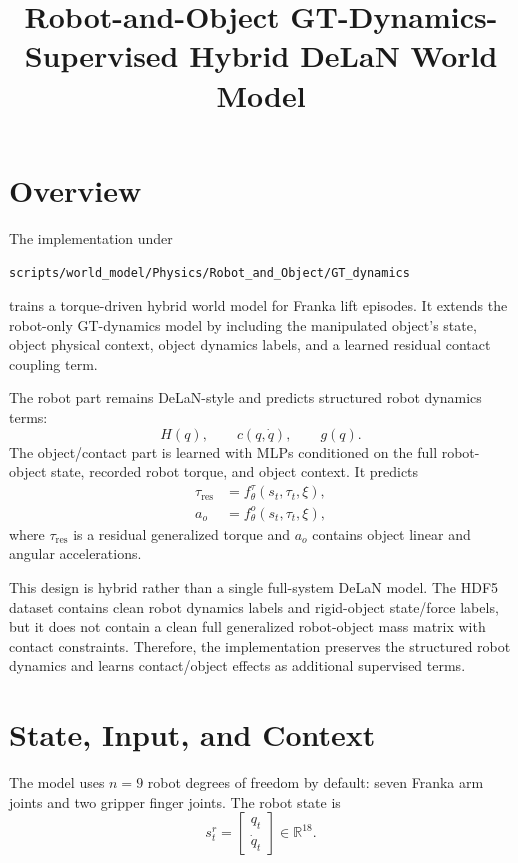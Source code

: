 \documentclass[11pt]{article}
\title{Robot-and-Object GT-Dynamics-Supervised Hybrid DeLaN World Model}
\author{}
\date{}
\begin{document}
\maketitle

\section{Overview}

The implementation under
\begin{center}
\texttt{scripts/world\_model/Physics/Robot\_and\_Object/GT\_dynamics}
\end{center}
trains a torque-driven hybrid world model for Franka lift episodes. It extends
the robot-only GT-dynamics model by including the manipulated object's state,
object physical context, object dynamics labels, and a learned residual contact
coupling term.

The robot part remains DeLaN-style and predicts structured robot dynamics terms:
\begin{equation}
  H(q), \qquad c(q,\dot{q}), \qquad g(q).
\end{equation}
The object/contact part is learned with MLPs conditioned on the full robot-object
state, recorded robot torque, and object context. It predicts
\begin{align}
  \tau_{\mathrm{res}} &= f_{\theta}^{\tau}(s_t,\tau_t,\xi), \\
  a_o &= f_{\theta}^{o}(s_t,\tau_t,\xi),
\end{align}
where \(\tau_{\mathrm{res}}\) is a residual generalized torque and \(a_o\)
contains object linear and angular accelerations.

This design is hybrid rather than a single full-system DeLaN model. The HDF5
dataset contains clean robot dynamics labels and rigid-object state/force labels,
but it does not contain a clean full generalized robot-object mass matrix with
contact constraints. Therefore, the implementation preserves the structured
robot dynamics and learns contact/object effects as additional supervised terms.

\section{State, Input, and Context}

The model uses \(n=9\) robot degrees of freedom by default: seven Franka arm
joints and two gripper finger joints. The robot state is
\begin{equation}
  s^r_t =
  \begin{bmatrix}
    q_t \\
    \dot{q}_t
  \end{bmatrix}
  \in \mathbb{R}^{18}.
\end{equation}
\end{document}
